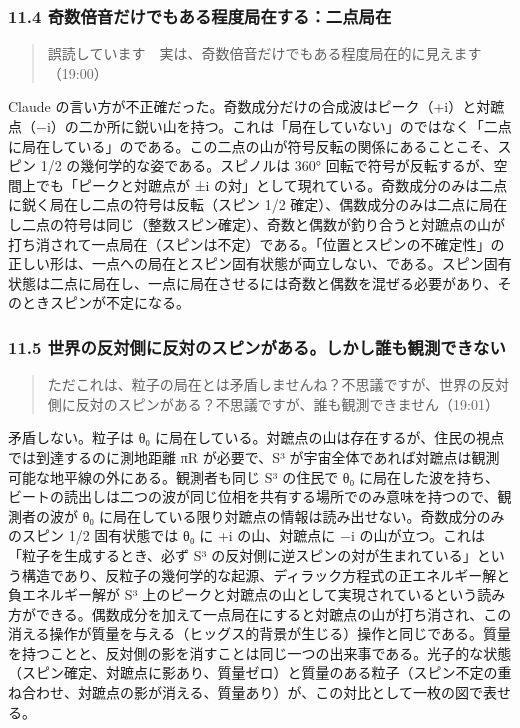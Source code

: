 \documentclass[
  a4paper,
]{ltjsarticle}
\begin{document}
\subsubsection{11.4
奇数倍音だけでもある程度局在する：二点局在}\label{ux5947ux6570ux500dux97f3ux3060ux3051ux3067ux3082ux3042ux308bux7a0bux5ea6ux5c40ux5728ux3059ux308bux4e8cux70b9ux5c40ux5728}

\begin{quote}
誤読しています　実は、奇数倍音だけでもある程度局在的に見えます（19:00）
\end{quote}

Claude
の言い方が不正確だった。奇数成分だけの合成波はピーク（+i）と対蹠点（−i）の二か所に鋭い山を持つ。これは「局在していない」のではなく「二点に局在している」のである。この二点の山が符号反転の関係にあることこそ、スピン
1/2 の幾何学的な姿である。スピノルは 360°
回転で符号が反転するが、空間上でも「ピークと対蹠点が ±i
の対」として現れている。奇数成分のみは二点に鋭く局在し二点の符号は反転（スピン
1/2
確定）、偶数成分のみは二点に局在し二点の符号は同じ（整数スピン確定）、奇数と偶数が釣り合うと対蹠点の山が打ち消されて一点局在（スピンは不定）である。「位置とスピンの不確定性」の正しい形は、一点への局在とスピン固有状態が両立しない、である。スピン固有状態は二点に局在し、一点に局在させるには奇数と偶数を混ぜる必要があり、そのときスピンが不定になる。

\subsubsection{11.5
世界の反対側に反対のスピンがある。しかし誰も観測できない}\label{ux4e16ux754cux306eux53cdux5bfeux5074ux306bux53cdux5bfeux306eux30b9ux30d4ux30f3ux304cux3042ux308bux3057ux304bux3057ux8ab0ux3082ux89b3ux6e2cux3067ux304dux306aux3044}

\begin{quote}
ただこれは、粒子の局在とは矛盾しませんね？不思議ですが、世界の反対側に反対のスピンがある？不思議ですが、誰も観測できません（19:01）
\end{quote}

矛盾しない。粒子は θ₀
に局在している。対蹠点の山は存在するが、住民の視点では到達するのに測地距離
πR が必要で、S³
が宇宙全体であれば対蹠点は観測可能な地平線の外にある。観測者も同じ S³
の住民で θ₀
に局在した波を持ち、ビートの読出しは二つの波が同じ位相を共有する場所でのみ意味を持つので、観測者の波が
θ₀ に局在している限り対蹠点の情報は読み出せない。奇数成分のみのスピン
1/2 固有状態では θ₀ に +i の山、対蹠点に −i
の山が立つ。これは「粒子を生成するとき、必ず S³
の反対側に逆スピンの対が生まれている」という構造であり、反粒子の幾何学的な起源、ディラック方程式の正エネルギー解と負エネルギー解が
S³
上のピークと対蹠点の山として実現されているという読み方ができる。偶数成分を加えて一点局在にすると対蹠点の山が打ち消され、この消える操作が質量を与える（ヒッグス的背景が生じる）操作と同じである。質量を持つことと、反対側の影を消すことは同じ一つの出来事である。光子的な状態（スピン確定、対蹠点に影あり、質量ゼロ）と質量のある粒子（スピン不定の重ね合わせ、対蹠点の影が消える、質量あり）が、この対比として一枚の図で表せる。
\end{document}
